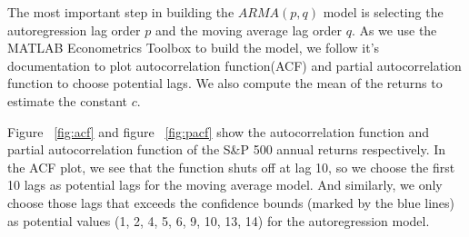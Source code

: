 \documentclass{article}
\begin{document}
The most important step in building the $ARMA(p, q)$ model is selecting the autoregression lag order $p$ and the moving average lag order $q$. As we use the MATLAB Econometrics Toolbox to build the model, we follow it's documentation\cite{lags} to plot autocorrelation function(ACF) and partial autocorrelation function to choose potential lags. We also compute the mean of the returns to estimate the constant $c$.

Figure ~\ref{fig:acf} and figure ~\ref{fig:pacf} show the autocorrelation function and partial autocorrelation function of the S\&P 500 annual returns respectively. In the ACF plot, we see that the function shuts off at lag 10, so we choose the first 10 lags as potential lags for the moving average model. And similarly, we only choose those lags that exceeds the confidence bounds (marked by the blue lines) as potential values (1, 2, 4, 5, 6, 9, 10, 13, 14) for the autoregression model.
\end{document}
